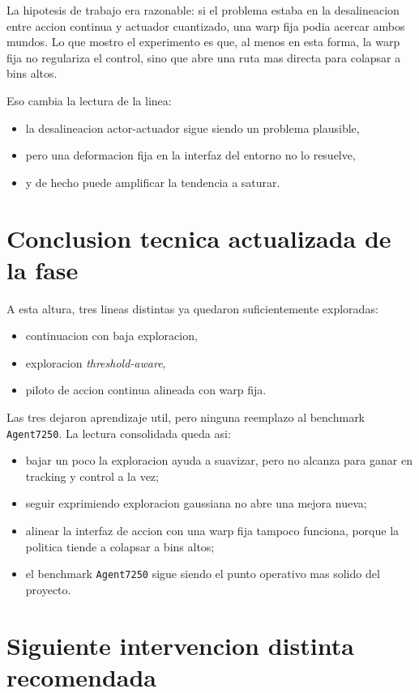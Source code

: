 \documentclass[11pt,a4paper]{article}
\begin{document}
La hipotesis de trabajo era razonable: si el problema estaba en la desalineacion entre accion continua y actuador cuantizado, una warp fija podia acercar ambos mundos. Lo que mostro el experimento es que, al menos en esta forma, la warp fija no regulariza el control, sino que abre una ruta mas directa para colapsar a bins altos.

Eso cambia la lectura de la linea:

\begin{itemize}
\item la desalineacion actor-actuador sigue siendo un problema plausible,
\item pero una deformacion fija en la interfaz del entorno no lo resuelve,
\item y de hecho puede amplificar la tendencia a saturar.
\end{itemize}

\section{Conclusion tecnica actualizada de la fase}

A esta altura, tres lineas distintas ya quedaron suficientemente exploradas:

\begin{itemize}
\item continuacion con baja exploracion,
\item exploracion \textit{threshold-aware},
\item piloto de accion continua alineada con warp fija.
\end{itemize}

Las tres dejaron aprendizaje util, pero ninguna reemplazo al benchmark \texttt{Agent7250}. La lectura consolidada queda asi:

\begin{itemize}
\item bajar un poco la exploracion ayuda a suavizar, pero no alcanza para ganar en tracking y control a la vez;
\item seguir exprimiendo exploracion gaussiana no abre una mejora nueva;
\item alinear la interfaz de accion con una warp fija tampoco funciona, porque la politica tiende a colapsar a bins altos;
\item el benchmark \texttt{Agent7250} sigue siendo el punto operativo mas solido del proyecto.
\end{itemize}

\section{Siguiente intervencion distinta recomendada}
\end{document}
